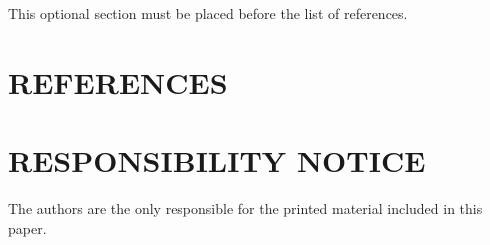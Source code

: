 \documentclass[10pt,fleqn,a4paper,twoside]{article}
\begin{document}
	This optional section must be placed before the list of references.
	
	\section{REFERENCES} 
	
	
	\renewcommand{\refname}{}
	
	
	\section{RESPONSIBILITY NOTICE}
	
	The authors are the only responsible for the printed material included in this paper.
	
\end{document}
